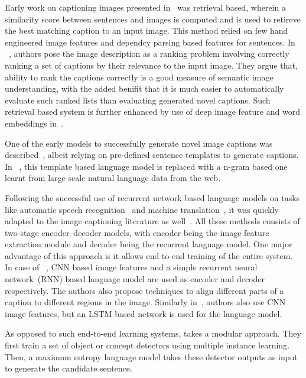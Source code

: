 Early work on captioning images presented in~\cite{Farhadi2010} was retrieval
based, wherein a similarity score between sentences and images is computed and
is used to retireve the best matching caption to an input image. 
This method relied on few hand engineered image features and dependcy parsing
based features for sentences.
In ~\cite{Hodosh2013}, authors pose the image description as a ranking problem
involving correctly ranking a set of captions by their relevance to the input
image.
They argue that, ability to rank the captions correctly is a good measure of
semantic image understanding, with the added benifit that it is much easier to
automatically evaluate such ranked lists than evaluating generated novel
captions.
Such retrieval based system is further enhanced by use of deep image feature and
word embeddings in~\cite{Karpathy2014}.

One of the early models to successfully generate novel image captions was
described~\cite{kulkarni2013babytalk}, albeit relying on pre-defined sentence
templates to generate captions.
In ~\cite{Li2011}, this template based language model is replaced with a n-gram
based one learnt from large scale natural language data from the web.

Following the successful use of recurrent network based language models on
tasks like automatic speech recognition~\cite{mikolov2010recurrent} and machine
translation~\cite{bahdanau2014neural}, it was quickly adapted to the image
captioning literature as well~\cite{Karpathy_2015_CVPR, Vinyals_2015_CVPR,
donahue2015long}.
All these methods consists of two-stage encoder--decoder models, with 
encoder being the image feature extraction module and decoder being the
recurrent language model.
One major advantage of this approach is it allows end to end training of the
entire system.
In case of ~\cite{Karpathy_2015_CVPR}, CNN based image features and a simple
recurrent neural network~(RNN) based language model are used as encoder and
decoder respectively.
The authors also propose techniques to align different parts of a caption to
different regions in the image. 
Similarly in~\cite{Vinyals_2015_CVPR}, authors also use CNN image features, but
an LSTM based network is used for the language model.

As opposed to such end-to-end learning systems, \cite{Fang2015} takes a modular
approach. 
They first train a set of object or concept detectors using multiple instance
learning. 
Then, a maximum entropy language model takes these detector outputs as input to
generate the candidate sentence.
